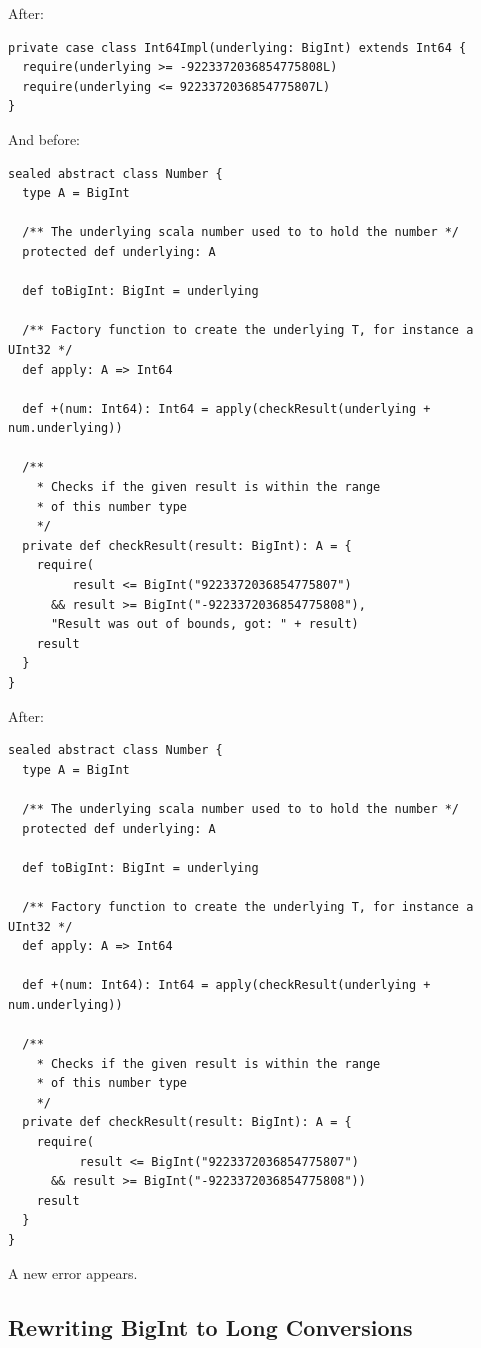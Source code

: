 \documentclass[runningheads]{llncs}
\begin{document}
After:
\begin{lstlisting}[style=scala]
private case class Int64Impl(underlying: BigInt) extends Int64 {
  require(underlying >= -9223372036854775808L)
  require(underlying <= 9223372036854775807L)
}
\end{lstlisting}

And before:
\begin{lstlisting}[style=scala]
sealed abstract class Number {
  type A = BigInt

  /** The underlying scala number used to to hold the number */
  protected def underlying: A

  def toBigInt: BigInt = underlying

  /** Factory function to create the underlying T, for instance a UInt32 */
  def apply: A => Int64

  def +(num: Int64): Int64 = apply(checkResult(underlying + num.underlying))

  /**
    * Checks if the given result is within the range
    * of this number type
    */
  private def checkResult(result: BigInt): A = {
    require(
         result <= BigInt("9223372036854775807")
      && result >= BigInt("-9223372036854775808"),
      "Result was out of bounds, got: " + result)
    result
  }
}
\end{lstlisting}

After:
\begin{lstlisting}[style=scala]
sealed abstract class Number {
  type A = BigInt

  /** The underlying scala number used to to hold the number */
  protected def underlying: A

  def toBigInt: BigInt = underlying

  /** Factory function to create the underlying T, for instance a UInt32 */
  def apply: A => Int64

  def +(num: Int64): Int64 = apply(checkResult(underlying + num.underlying))

  /**
    * Checks if the given result is within the range
    * of this number type
    */
  private def checkResult(result: BigInt): A = {
    require(
          result <= BigInt("9223372036854775807")
      && result >= BigInt("-9223372036854775808"))
    result
  }
}
\end{lstlisting}

A new error appears.


\subsection{Rewriting BigInt to Long Conversions}
\end{document}
